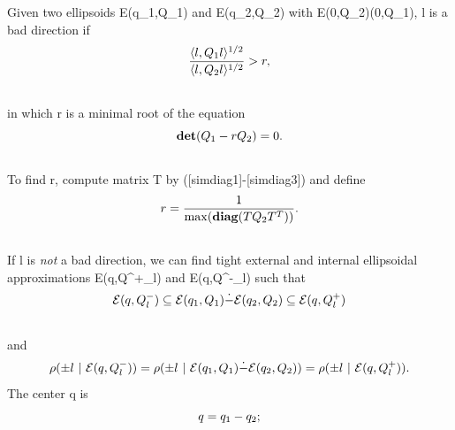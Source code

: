\documentclass[letterpaper,10pt,english]{sphinxmanual}
\begin{document}
Given two ellipsoids {\mathcal E}(q_1,Q_1) and
{\mathcal E}(q_2,Q_2) with
{\mathcal E}(0,Q_2)(0,Q_1), l is a
bad direction if
\begin{gather}
\begin{split}\frac{\langle l,Q_1l\rangle^{1/2}}{\langle l,Q_2l\rangle^{1/2}}>r,\end{split}\notag\\\begin{split}\end{split}\notag
\end{gather}
in which r is a minimal root of the equation
\begin{gather}
\begin{split}{\bf det}(Q_1-rQ_2) = 0.\end{split}\notag\\\begin{split}\end{split}\notag
\end{gather}
To find r, compute matrix T by ({[}simdiag1{]}-{[}simdiag3{]})
and define
\begin{gather}
\begin{split}r = \frac{1}{\max({\bf diag}(TQ_2T^T))}.\end{split}\notag\\\begin{split}\end{split}\notag
\end{gather}
If l is \emph{not} a bad direction, we can find tight external and
internal ellipsoidal approximations {\mathcal E}(q,Q^+_l) and
{\mathcal E}(q,Q^-_l) such that
\begin{gather}
\begin{split}{\mathcal E}(q,Q^-_l)\subseteq{\mathcal E}(q_1,Q_1)\dot{-}{\mathcal E}(q_2,Q_2)\subseteq{\mathcal E}(q,Q^+_l)\end{split}\notag\\\begin{split}\end{split}\notag
\end{gather}
and
\begin{gather}
\begin{split}\rho(\pm l ~|~ {\mathcal E}(q,Q_l^-)) =
\rho(\pm l ~|~ {\mathcal E}(q_1,Q_1)\dot{-}{\mathcal E}(q_2,Q_2)) =
\rho(\pm l ~|~ {\mathcal E}(q,Q_l^+)).\end{split}\notag
\end{gather}
The center q is
\begin{gather}
\begin{split}q = q_1 - q_2;  \label{minkdiff_c}\end{split}\notag\\\begin{split}\end{split}\notag
\end{gather}
\end{document}

